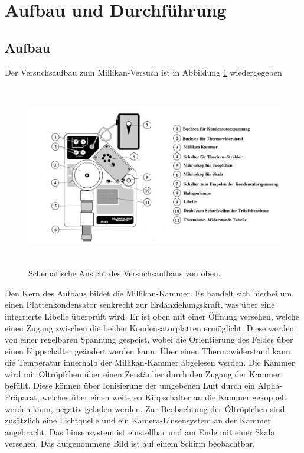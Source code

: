 \section{Aufbau und Durchführung}
\subsection{Aufbau}
\label{sec:Aufbau}

Der Versuchsaufbau zum Millikan-Versuch ist in Abbildung \ref{millikan} wiedergegeben

\begin{figure}
  \centering
  \includegraphics[height=8cm]{ressources/aufbau.png}
  \caption{Schematische Ansicht des Versuchsaufbaus von oben. \cite{skript}}
  \label{millikan}
\end{figure}


Den Kern des Aufbaus bildet die Millikan-Kammer.
Es handelt sich hierbei um einen Plattenkondensator senkrecht zur Erdanziehungskraft, was über eine integrierte Libelle überprüft wird.
Er ist oben mit einer Öffnung versehen, welche einen Zugang zwischen die beiden Kondensatorplatten ermöglicht.
Diese werden von einer regelbaren Spannung gespeist, wobei die Orientierung des Feldes über einen Kippschalter geändert werden kann.
Über einen Thermowiderstand kann die Temperatur innerhalb der Millikan-Kammer abgelesen werden.
Die Kammer wird mit Öltröpfchen über einen Zerstäuber durch den Zugang der Kammer befüllt.
Diese können über Ionisierung der umgebenen Luft durch ein Alpha-Präparat, welches über einen weiteren Kippschalter an die Kammer gekoppelt werden kann, negativ geladen werden.
Zur Beobachtung der Öltröpfchen sind zusätzlich eine Lichtquelle und ein Kamera-Linsensystem an der Kammer angebracht.
Das Linsensystem ist einstellbar und am Ende mit einer Skala versehen.
Das aufgenommene Bild ist auf einem Schirm beobachtbar.
